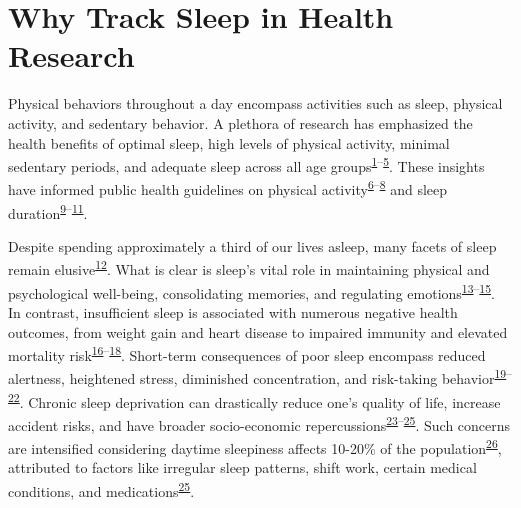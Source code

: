 \documentclass[
  10pt,
]{scrbook}
\begin{document}
\hypertarget{why-track-sleep-in-health-research}{%
\section{Why Track Sleep in Health
Research}\label{why-track-sleep-in-health-research}}

Physical behaviors throughout a day encompass activities such as sleep,
physical activity, and sedentary behavior. A plethora of research has
emphasized the health benefits of optimal sleep, high levels of physical
activity, minimal sedentary periods, and adequate sleep across all age
groups\textsuperscript{\protect\hyperlink{ref-kraus_physical_2019}{1}--\protect\hyperlink{ref-jennum_suxf8vn_sundhed_2015}{5}}.
These insights have informed public health guidelines on physical
activity\textsuperscript{\protect\hyperlink{ref-kl_physical_2018}{6}--\protect\hyperlink{ref-Sundhedsstyrelsen2023_unge}{8}}
and sleep
duration\textsuperscript{\protect\hyperlink{ref-hirshkowitz_2015}{9}--\protect\hyperlink{ref-watson_2015}{11}}.

Despite spending approximately a third of our lives asleep, many facets
of sleep remain
elusive\textsuperscript{\protect\hyperlink{ref-ma_sleep_2017}{12}}. What
is clear is sleep's vital role in maintaining physical and psychological
well-being, consolidating memories, and regulating
emotions\textsuperscript{\protect\hyperlink{ref-worley_2018}{13}--\protect\hyperlink{ref-scott_2021}{15}}.
In contrast, insufficient sleep is associated with numerous negative
health outcomes, from weight gain and heart disease to impaired immunity
and elevated mortality
risk\textsuperscript{\protect\hyperlink{ref-consensus_conference_panel_recommended_2015}{16}--\protect\hyperlink{ref-hale_2020}{18}}.
Short-term consequences of poor sleep encompass reduced alertness,
heightened stress, diminished concentration, and risk-taking
behavior\textsuperscript{\protect\hyperlink{ref-shochat_2014}{19}--\protect\hyperlink{ref-bonnet_1985}{22}}.
Chronic sleep deprivation can drastically reduce one's quality of life,
increase accident risks, and have broader socio-economic
repercussions\textsuperscript{\protect\hyperlink{ref-connor_2002}{23}--\protect\hyperlink{ref-roth_1996}{25}}.
Such concerns are intensified considering daytime sleepiness affects
10-20\% of the
population\textsuperscript{\protect\hyperlink{ref-wang_2019}{26}},
attributed to factors like irregular sleep patterns, shift work, certain
medical conditions, and
medications\textsuperscript{\protect\hyperlink{ref-roth_1996}{25}}.
\end{document}
